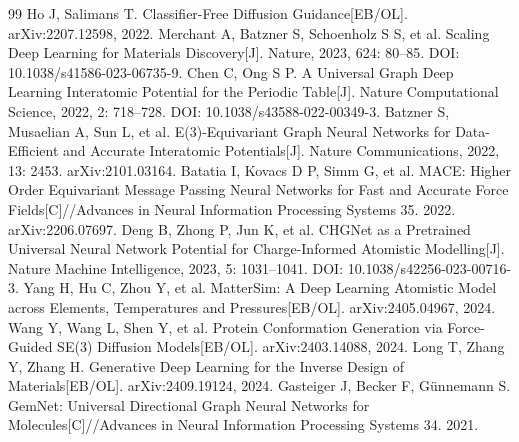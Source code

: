 \begin{thebibliography}{99}
 Ho J, Salimans T. Classifier-Free Diffusion Guidance[EB/OL]. arXiv:2207.12598, 2022.
 Merchant A, Batzner S, Schoenholz S S, et al. Scaling Deep Learning for Materials Discovery[J]. Nature, 2023, 624: 80--85. DOI: 10.1038/s41586-023-06735-9.
 Chen C, Ong S P. A Universal Graph Deep Learning Interatomic Potential for the Periodic Table[J]. Nature Computational Science, 2022, 2: 718--728. DOI: 10.1038/s43588-022-00349-3.
 Batzner S, Musaelian A, Sun L, et al. E(3)-Equivariant Graph Neural Networks for Data-Efficient and Accurate Interatomic Potentials[J]. Nature Communications, 2022, 13: 2453. arXiv:2101.03164.
 Batatia I, Kovacs D P, Simm G, et al. MACE: Higher Order Equivariant Message Passing Neural Networks for Fast and Accurate Force Fields[C]//Advances in Neural Information Processing Systems 35. 2022. arXiv:2206.07697.
 Deng B, Zhong P, Jun K, et al. CHGNet as a Pretrained Universal Neural Network Potential for Charge-Informed Atomistic Modelling[J]. Nature Machine Intelligence, 2023, 5: 1031--1041. DOI: 10.1038/s42256-023-00716-3.
 Yang H, Hu C, Zhou Y, et al. MatterSim: A Deep Learning Atomistic Model across Elements, Temperatures and Pressures[EB/OL]. arXiv:2405.04967, 2024.
 Wang Y, Wang L, Shen Y, et al. Protein Conformation Generation via Force-Guided SE(3) Diffusion Models[EB/OL]. arXiv:2403.14088, 2024.
 Long T, Zhang Y, Zhang H. Generative Deep Learning for the Inverse Design of Materials[EB/OL]. arXiv:2409.19124, 2024.
 Gasteiger J, Becker F, G{\"u}nnemann S. GemNet: Universal Directional Graph Neural Networks for Molecules[C]//Advances in Neural Information Processing Systems 34. 2021.
\end{thebibliography}
